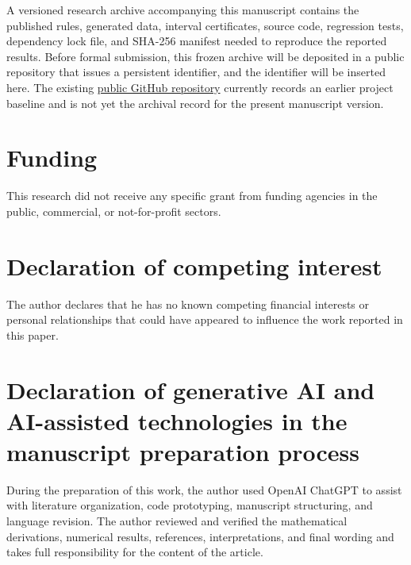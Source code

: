 \documentclass[preprint,12pt]{elsarticle}
\theoremstyle{remark}
\begin{document}
A versioned research archive accompanying this manuscript contains the
published rules, generated data, interval certificates, source code,
regression tests, dependency lock file, and SHA-256 manifest needed to
reproduce the reported results. Before formal submission, this frozen
archive will be deposited in a public repository that issues a
persistent identifier, and the identifier will be inserted here. The
existing
\href{https://github.com/TurkeyOp/partial-moment-stieltjes-quadrature}{public GitHub repository}
currently records an earlier project baseline and is not yet the
archival record for the present manuscript version.

\section*{Funding}

This research did not receive any specific grant from funding agencies
in the public, commercial, or not-for-profit sectors.

\section*{Declaration of competing interest}

The author declares that he has no known competing financial interests
or personal relationships that could have appeared to influence the
work reported in this paper.

\section*{Declaration of generative AI and AI-assisted technologies in
the manuscript preparation process}

During the preparation of this work, the author used OpenAI ChatGPT to
assist with literature organization, code prototyping, manuscript
structuring, and language revision. The author reviewed and verified
the mathematical derivations, numerical results, references,
interpretations, and final wording and takes full responsibility for
the content of the article.
\end{document}
